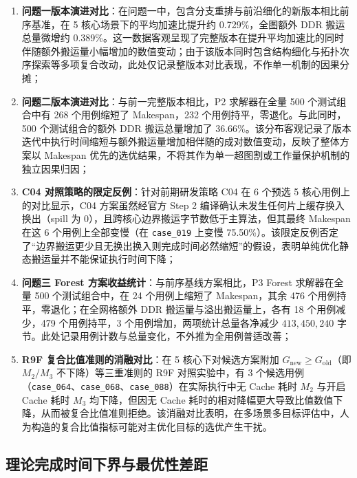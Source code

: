 \documentclass[anonymous,withtoc]{gmcm2026}
\providecommand{\tightlist}{\setlength{\itemsep}{0pt}\setlength{\parskip}{0pt}}
\begin{document}
\begin{enumerate}
\def\labelenumi{\arabic{enumi}.}
\tightlist
\item
  \textbf{问题一版本演进对比}：在问题一中，包含分支重排与前沿细化的新版本相比前序基准，在 5 核心场景下的平均加速比提升约 0.729\%，全图额外 DDR 搬运总量微增约 0.389\%。这一数据客观呈现了完整版本在提升平均加速比的同时伴随额外搬运量小幅增加的数值变动；由于该版本同时包含结构细化与拓扑次序探索等多项复合改动，此处仅记录整版本对比表现，不作单一机制的因果分摊；
\item
  \textbf{问题二版本演进对比}：与前一完整版本相比，P2 求解器在全量 500 个测试组合中有 268 个用例缩短了 Makespan，232 个用例持平，零退化。与此同时，500 个测试组合的额外 DDR 搬运总量增加了 36.66\%。该分布客观记录了版本迭代中执行时间缩短与额外搬运量增加相伴随的成对数值变动，反映了整体方案以 Makespan 优先的选优结果，不将其作为单一超图割或工作量保护机制的独立因果归因；
\item
  \textbf{C04 对照策略的限定反例}：针对前期研发策略 C04 在 6 个预选 5 核心用例上的对比显示，C04 方案虽然经官方 Step 2 编译确认未发生任何片上缓存换入换出（spill 为 0），且跨核心边界搬运字节数低于主算法，但其最终 Makespan 在这 6 个用例上全部变慢（在 \texttt{case\_019} 上变慢 75.50\%）。该限定反例否定了``边界搬运更少且无换出换入则完成时间必然缩短''的假设，表明单纯优化静态搬运量并不能保证执行时间下降；
\item
  \textbf{问题三 Forest 方案收益统计}：与前序基线方案相比，P3 Forest 求解器在全量 500 个测试组合中，在 24 个用例上缩短了 Makespan，其余 476 个用例持平，零退化；在全网格额外 DDR 搬运量与溢出搬运量上，各有 18 个用例减少，479 个用例持平，3 个用例增加，两项统计总量各净减少 \(413{,}450{,}240\) 字节。此处记录用例计数与总量变化，不外推为全用例普适改善；
\item
  \textbf{R9F 复合比值准则的消融对比}：在 5 核心下对候选方案附加 \(G_{\mathrm{new}} \ge G_{\mathrm{old}}\)（即 \(M_2/M_3\) 不下降）等三重准则的 R9F 对照实验中，有 3 个候选用例（\texttt{case\_064}、\texttt{case\_068}、\texttt{case\_088}）在实际执行中无 Cache 耗时 \(M_2\) 与开启 Cache 耗时 \(M_3\) 均下降，但因无 Cache 耗时的相对降幅更大导致比值数值下降，从而被复合比值准则拒绝。该消融对比表明，在多场景多目标评估中，人为构造的复合比值指标可能对主优化目标的选优产生干扰。
\end{enumerate}

\subsection{理论完成时间下界与最优性差距}
\end{document}
